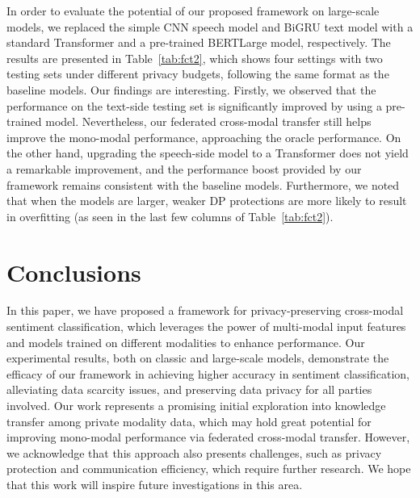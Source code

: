 \documentclass[11pt]{article}
\begin{document}
In order to evaluate the potential of our proposed framework on large-scale models, we replaced the simple CNN speech model and BiGRU text model with a standard Transformer and a pre-trained BERTLarge model, respectively. The results are presented in Table~\ref{tab:fct2}, which shows four settings with two testing sets under different privacy budgets, following the same format as the baseline models. Our findings are interesting. Firstly, we observed that the performance on the text-side testing set is significantly improved by using a pre-trained model. Nevertheless, our federated cross-modal transfer still helps improve the mono-modal performance, approaching the oracle performance. On the other hand, upgrading the speech-side model to a Transformer does not yield a remarkable improvement, and the performance boost provided by our framework remains consistent with the baseline models. Furthermore, we noted that when the models are larger, weaker DP protections are more likely to result in overfitting (as seen in the last few columns of Table~\ref{tab:fct2}).





\section{Conclusions}
In this paper, we have proposed a framework for privacy-preserving cross-modal sentiment classification, which leverages the power of multi-modal input features and models trained on different modalities to enhance performance. Our experimental results, both on classic and large-scale models, demonstrate the efficacy of our framework in achieving higher accuracy in sentiment classification, alleviating data scarcity issues, and preserving data privacy for all parties involved. Our work represents a promising initial exploration into knowledge transfer among private modality data, which may hold great potential for improving mono-modal performance via federated cross-modal transfer. However, we acknowledge that this approach also presents challenges, such as privacy protection and communication efficiency, which require further research. We hope that this work will inspire future investigations in this area.
\end{document}
